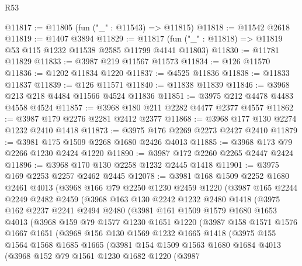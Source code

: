 \begin{lexlean}{R53}
\begin{coremodule}
@11817 := @11805 (fun ("_" : @11543) => @11815)
@11818 := @11542 @2618
@11819 := @1407 @3894
@11829 := @11817 (fun ("_" : @11818) => @11819 @53 @115 @1232 @11538 @2585 @11799 @4141 @11803)
@11830 := @11781 @11829
@11833 := @3987 @219 @11567 @11573
@11834 := @126 @11570
@11836 := @1202 @11834 @1220
@11837 := @4525 @11836
@11838 := @11833 @11837
@11839 := @126 @11571
@11840 := @11838 @11839
@11846 := @3968 @213 @218 @4484 @11566 @4524 @11836
@11851 := @3975 @212 @4478 @4483 @4558 @4524
@11857 := @3968 @180 @211 @2282 @4477 @2377 @4557
@11862 := @3987 @179 @2276 @2281 @2412 @2377
@11868 := @3968 @177 @130 @2274 @1232 @2410 @1418
@11873 := @3975 @176 @2269 @2273 @2427 @2410
@11879 := @3981 @175 @1509 @2268 @1680 @2426 @4013
@11885 := @3968 @173 @79 @2266 @1230 @2424 @1220
@11890 := @3987 @172 @2260 @2265 @2447 @2424
@11896 := @3968 @170 @130 @2258 @1232 @2445 @1418
@11901 := @3975 @169 @2253 @2257 @2462 @2445
@12078 := @3981
    @168
    @1509
    @2252
    @1680
    @2461
    @4013
    (@3968
      @166
      @79
      @2250
      @1230
      @2459
      @1220
      (@3987
        @165
        @2244
        @2249
        @2482
        @2459
        (@3968
          @163
          @130
          @2242
          @1232
          @2480
          @1418
          (@3975
            @162
            @2237
            @2241
            @2494
            @2480
            (@3981
              @161
              @1509
              @1579
              @1680
              @1653
              @4013
              (@3968
                @159
                @79
                @1577
                @1230
                @1651
                @1220
                (@3987
                  @158
                  @1571
                  @1576
                  @1667
                  @1651
                  (@3968
                    @156
                    @130
                    @1569
                    @1232
                    @1665
                    @1418
                    (@3975
                      @155
                      @1564
                      @1568
                      @1685
                      @1665
                      (@3981
                        @154
                        @1509
                        @1563
                        @1680
                        @1684
                        @4013
                        (@3968
                          @152
                          @79
                          @1561
                          @1230
                          @1682
                          @1220
                          (@3987

\end{coremodule}
\end{lexlean}
